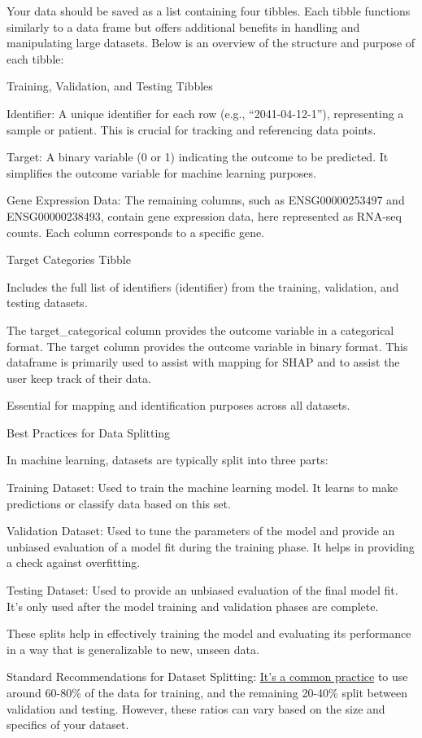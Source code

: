 \documentclass[
]{article}
\begin{document}
Your data should be saved as a list containing four tibbles. Each tibble
functions similarly to a data frame but offers additional benefits in
handling and manipulating large datasets. Below is an overview of the
structure and purpose of each tibble:

Training, Validation, and Testing Tibbles

Identifier: A unique identifier for each row (e.g., ``2041-04-12-1''),
representing a sample or patient. This is crucial for tracking and
referencing data points.

Target: A binary variable (0 or 1) indicating the outcome to be
predicted. It simplifies the outcome variable for machine learning
purposes.

Gene Expression Data: The remaining columns, such as ENSG00000253497 and
ENSG00000238493, contain gene expression data, here represented as
RNA-seq counts. Each column corresponds to a specific gene.

Target Categories Tibble

Includes the full list of identifiers (identifier) from the training,
validation, and testing datasets.

The target\_categorical column provides the outcome variable in a
categorical format. The target column provides the outcome variable in
binary format. This dataframe is primarily used to assist with mapping
for SHAP and to assist the user keep track of their data.

Essential for mapping and identification purposes across all datasets.

Best Practices for Data Splitting

In machine learning, datasets are typically split into three parts:

Training Dataset: Used to train the machine learning model. It learns to
make predictions or classify data based on this set.

Validation Dataset: Used to tune the parameters of the model and provide
an unbiased evaluation of a model fit during the training phase. It
helps in providing a check against overfitting.

Testing Dataset: Used to provide an unbiased evaluation of the final
model fit. It's only used after the model training and validation phases
are complete.

These splits help in effectively training the model and evaluating its
performance in a way that is generalizable to new, unseen data.

Standard Recommendations for Dataset Splitting:
\href{https://encord.com/blog/train-val-test-split/}{It's a common
practice} to use around 60-80\% of the data for training, and the
remaining 20-40\% split between validation and testing. However, these
ratios can vary based on the size and specifics of your dataset.
\end{document}
